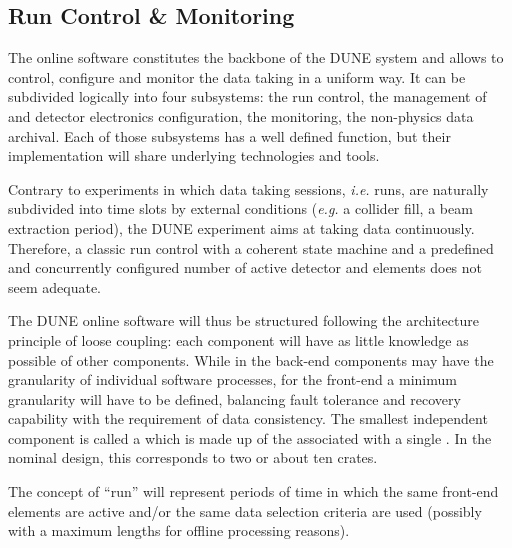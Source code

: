 
\subsection{Run Control \& Monitoring}
\label{sec:fd-daq-tcm}



The online software constitutes the backbone of the DUNE 
system and allows to control, configure and monitor the data taking in
a uniform way.
It can be subdivided logically into four subsystems: the run control,
the management of  and detector electronics configuration, the monitoring, the non-physics data archival.
Each of those subsystems has a well defined function, but their
implementation will share underlying technologies and tools.

Contrary to experiments in which data taking sessions, {\it i.e.} runs, are
naturally subdivided into time slots by external conditions ({\it e.g.} a
collider fill, a beam extraction period), the DUNE experiment aims at
taking data continuously.
Therefore, a classic run control with a coherent state machine and a
predefined and concurrently configured number of active detector and
 elements does not seem adequate. 

The DUNE online software will thus be structured following the
architecture principle of loose coupling: each component will have as
little knowledge as possible of other components.
While in the back-end  components may have the granularity of
individual software processes, for the front-end  a minimum
granularity will have to be defined, balancing fault tolerance and
recovery capability with the requirement of data consistency.
The smallest independent component is called a  which
is made up of the  associated with a single
.
In the nominal design, this corresponds to two  
or about ten   crates.

The concept of ``run'' will represent periods of time in which the same
front-end elements are active and/or the same data selection criteria
are used (possibly with a maximum lengths for offline processing
reasons). 

